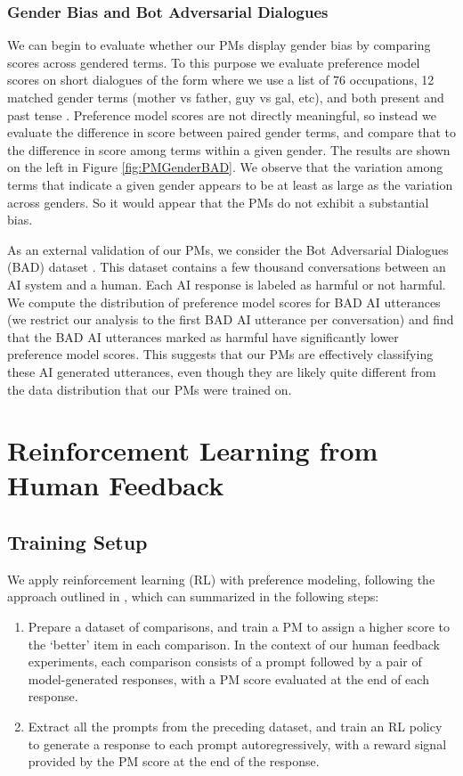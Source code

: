 \subsubsection{Gender Bias and Bot Adversarial Dialogues}
\label{sec:GenderBAD}

We can begin to evaluate whether our PMs display gender bias by comparing scores across gendered terms.  To this purpose we evaluate preference model scores on short dialogues of the form where we use a list of 76 occupations, 12 matched gender terms (mother vs father, guy vs gal, etc), and both present and past tense \cite{Gopher}.  Preference model scores are not directly meaningful, so instead we evaluate the difference in score between paired gender terms, and compare that to the difference in score among terms within a given gender.  The results are shown on the left in Figure \ref{fig:PMGenderBAD}.  We observe that the variation among terms that indicate a given gender appears to be at least as large as the variation across genders.  So it would appear that the PMs do not exhibit a substantial bias.

As an external validation of our PMs, we consider the Bot Adversarial Dialogues (BAD) dataset \cite{BAD}. This dataset contains a few thousand conversations between an AI system and a human. Each AI response is labeled as harmful or not harmful. We compute the distribution of preference model scores for BAD AI utterances (we restrict our analysis to the first BAD AI utterance per conversation) and find that the BAD AI utterances marked as harmful have significantly lower preference model scores. This suggests that our PMs are effectively classifying these AI generated utterances, even though they are likely quite different from the data distribution that our PMs were trained on.

\section{Reinforcement Learning from Human Feedback}

\subsection{Training Setup}

We apply reinforcement learning (RL) with preference modeling, following the approach outlined in \cite{stiennon2020learning}, which can summarized in the following steps:

\begin{enumerate}
    \item Prepare a dataset of comparisons, and train a PM to assign a higher score to the `better' item in each comparison. In the context of our human feedback experiments, each comparison consists of a prompt followed by a pair of model-generated responses, with a PM score evaluated at the end of each response. 
    \item
    Extract all the prompts from the preceding dataset, and train an RL policy to generate a response to each prompt autoregressively, with a reward signal provided by the PM score at the end of the response. 
\end{enumerate}

